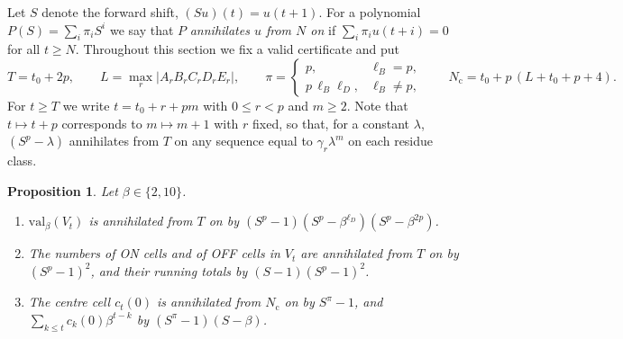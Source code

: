 \documentclass[11pt]{article}
\newtheorem{proposition}[theorem]{Proposition}
\theoremstyle{definition}
\theoremstyle{remark}
\begin{document}
Let $S$ denote the forward shift, $(Su)(t)=u(t+1)$. For a polynomial $P(S)=\sum_i \pi_iS^i$ we say that $P$ \emph{annihilates $u$ from $N$ on} if $\sum_i\pi_iu(t+i)=0$ for all $t\ge N$. Throughout this section we fix a valid certificate and put
\[
T=t_0+2p,\qquad L=\max_r|A_rB_rC_rD_rE_r|,\qquad
\pi=\begin{cases}p,&\ell_B=p,\\ p\,\ell_B\ell_D,&\ell_B\ne p,\end{cases}\qquad
N_{\mathrm c}=t_0+p\,(L+t_0+p+4).
\]
For $t\ge T$ we write $t=t_0+r+pm$ with $0\le r<p$ and $m\ge2$. Note that $t\mapsto t+p$ corresponds to $m\mapsto m+1$ with $r$ fixed, so that, for a constant $\lambda$, $(S^p-\lambda)$ annihilates from $T$ on any sequence equal to $\gamma_r\lambda^m$ on each residue class.

\begin{proposition}\label{prop:ann}
Let $\beta\in\{2,10\}$.
\begin{enumerate}
\item $\mathrm{val}_\beta(V_t)$ is annihilated from $T$ on by $(S^p-1)(S^p-\beta^{\ell_D})(S^p-\beta^{2p})$.
\item The numbers of ON cells and of OFF cells in $V_t$ are annihilated from $T$ on by $(S^p-1)^2$, and their running totals by $(S-1)(S^p-1)^2$.
\item The centre cell $c_t(0)$ is annihilated from $N_{\mathrm c}$ on by $S^\pi-1$, and $\sum_{k\le t}c_k(0)\beta^{t-k}$ by $(S^\pi-1)(S-\beta)$.
\end{enumerate}
\end{proposition}
\end{document}
